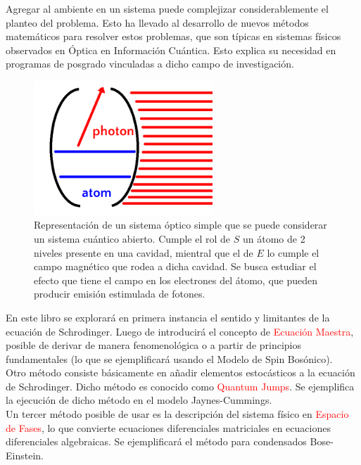 \documentclass{book}
\begin{document}
Agregar al ambiente en un sistema puede complejizar considerablemente el planteo del problema. Esto ha llevado al desarrollo de nuevos métodos matemáticos para resolver estos problemas, que son típicas en sistemas físicos observados en Óptica en Información Cuántica. Esto explica su necesidad en programas de posgrado vinculadas a dicho campo de investigación.

\begin{figure}[ht]
\centering
\includegraphics[width=0.6\textwidth]{cav.png}
\caption{Representación de un sistema óptico simple que se puede considerar un sistema cuántico abierto. Cumple el rol de $S$ un átomo de 2 niveles presente en una cavidad, mientral que el de $E$ lo cumple el campo magnético que rodea a dicha cavidad. Se busca estudiar el efecto que tiene el campo en los electrones del átomo, que pueden producir emisión estimulada de fotones. }
\end{figure}
En este libro se explorará en primera instancia el sentido y limitantes de la ecuación de Schrodinger. Luego de introducirá el concepto de \textcolor{red}{Ecuación Maestra}, posible de derivar de manera fenomenológica o a partir de principios fundamentales (lo que se ejemplificará usando el Modelo de Spin Bosónico). \\

Otro método consiste básicamente en añadir elementos estocásticos a la ecuación de Schrodinger. Dicho método es conocido como \textcolor{red}{Quantum Jumps}. Se ejemplifica la ejecución de dicho método en el modelo Jaynes-Cummings.\\

Un tercer método posible de usar es la descripción del sistema físico en \textcolor{red}{Espacio de Fases}, lo que convierte ecuaciones diferenciales matriciales en ecuaciones diferenciales algebraicas. Se ejemplificará el método para condensados Bose-Einstein.\\
\end{document}
